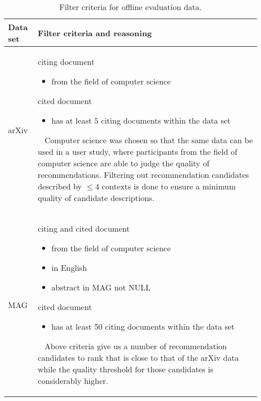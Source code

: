 
\begin{table}[]
\centering
    \caption{Filter criteria for offline evaluation data.}
    \label{tab:datasetfilter}
\begin{center}
    \begin{tabular}{lp{11.5cm}}
    \toprule
    Data set & Filter criteria and reasoning\\
    \midrule
    arXiv & citing document
            \begin{itemize}
                \item from the field of computer science
            \end{itemize}
            cited document
            \begin{itemize}
                \item has at least 5 citing documents within the data set
            \end{itemize}
            \ 
            \newline
            Computer science was chosen so that the same data can be used in a user study, where participants from the field of computer science are able to judge the quality of recommendations.
            \newline
            Filtering out recommendation candidates described by $\le$4 contexts is done to ensure a minimum quality of candidate descriptions.\\
    \midrule
    MAG & citing and cited document
            \begin{itemize}
                \item from the field of computer science
                \item in English
                \item abstract in MAG not NULL
            \end{itemize}
            cited document
            \begin{itemize}
                \item has at least 50 citing documents within the data set
            \end{itemize}
            \ 
            \newline
            Above criteria give us a number of recommendation candidates to rank that is close to that of the arXiv data while the quality threshold for those candidates is considerably higher.\\
    \midrule

\end{tabular}
\end{center}
\end{table}
